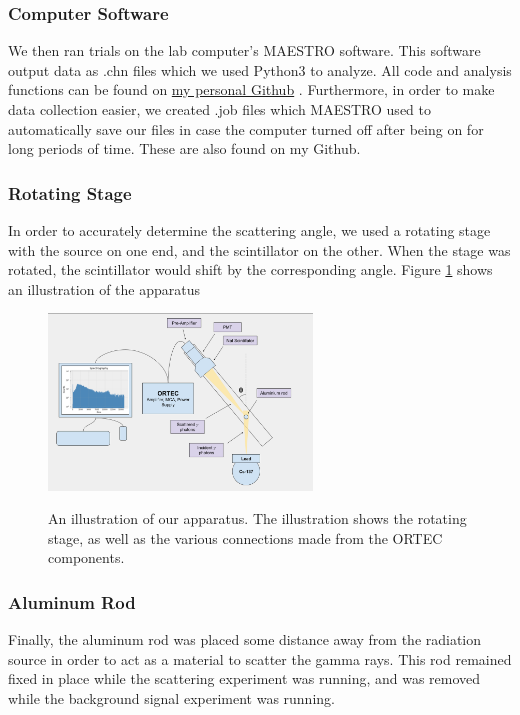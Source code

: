 \documentclass[10pt,letterpaper,onecolumn]{article}
\begin{document}
\subsubsection*{Computer Software}
We then ran trials on the lab computer's MAESTRO software. This software output data as .chn files which we used Python3 to analyze. All code and analysis functions can be found on \href{https://github.com/adeshpande03/seniorlab}{my personal Github} \cite{adesh}. Furthermore, in order to make data collection easier, we created .job files which MAESTRO used to automatically save our files in case the computer turned off after being on for long periods of time. These are also found on my Github.
\subsubsection*{Rotating Stage}
In order to accurately determine the scattering angle, we used a rotating stage with the source on one end, and the scintillator on the other. When the stage was rotated, the scintillator would shift by the corresponding angle. Figure \ref{fig:stage} shows an illustration of the apparatus
\begin{figure}[hbt!]
    \begin{center}
        {{\includegraphics[width=7cm]{Setup.png} }}%
        \caption{An illustration of our apparatus. The illustration shows the rotating stage, as well as the various connections made from the ORTEC components.}%
        \label{fig:stage}%
    \end{center}
\end{figure}
\subsubsection*{Aluminum Rod}
Finally, the aluminum rod was placed some distance away from the radiation source in order to act as a material to scatter the gamma rays. This rod remained fixed in place while the scattering experiment was running, and was removed while the background signal experiment was running.
\end{document}
